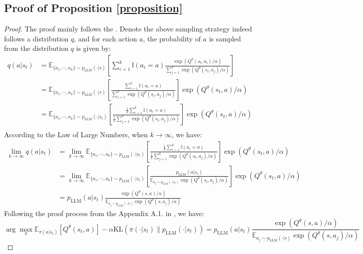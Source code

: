


\subsection{Proof of Proposition \ref{proposition}}
\propsa*
\begin{proof}
The proof mainly follows the \citep{li2024q}. Denote the above sampling strategy indeed follows a distribution $q$, and for each action $a$, the probability of $a$ is sampled from the distribution $q$ is given by:
\begin{equation}
    \begin{aligned}
            q(a|s_t)&=\mathbb{E}_{\{a_1,\cdots,a_k\}\sim p_\text{LLM}(\cdot|s)}\left[\sum_{i=1}^k \mathbb{I}(a_i=a) \frac{\exp( Q^\theta(s_t,a_i)/\alpha)}{\sum_{j=1}^k \exp( Q^\theta(s_t,a_j)/\alpha)}\right]\\
            &=\mathbb{E}_{\{a_1,\cdots,a_k\}\sim p_\text{LLM}(\cdot|s)}\left[ \frac{\sum_{i=1}^k \mathbb{I}(a_i=a)}{\sum_{j=1}^k \exp( Q^\theta(s_t,a_j)/\alpha)}\right]\exp( Q^\theta(s_t,a)/\alpha)\\
            &=\mathbb{E}_{\{a_1,\cdots,a_k\}\sim p_\text{LLM}(\cdot|s_t)}\left[ \frac{\frac{1}{k}\sum_{i=1}^k \mathbb{I}(a_i=a)}{\frac{1}{k}\sum_{j=1}^k \exp( Q^\theta(s_t,a_j)/\alpha)}\right]\exp( Q^\theta(s_t,a)/\alpha)\\
    \end{aligned}
\end{equation}
According to the Law of Large Numbers, when $k\rightarrow \infty$, we have:
\begin{equation}
\begin{aligned}
        \lim_{k\rightarrow\infty} q(a|s_t)&= \lim_{k\rightarrow\infty} \mathbb{E}_{\{a_1,\cdots,a_k\}\sim p_\text{LLM}(\cdot|s_t)}\left[ \frac{\frac{1}{k}\sum_{i=1}^k \mathbb{I}(a_i=a)}{\frac{1}{k}\sum_{j=1}^k \exp( Q^\theta(s_t,a_j)/\alpha)}\right]\exp( Q^\theta(s_t,a)/\alpha)\\
        &= \lim_{k\rightarrow\infty} \mathbb{E}_{\{a_1,\cdots,a_k\}\sim p_\text{LLM}(\cdot|s_t)}\left[ \frac{p_\text{LLM}(a|s_t)}{\mathbb{E}_{a_j \sim p_\text{LLM}(\cdot|s_t)} \exp( Q^\theta(s_t,a_j)/\alpha)}\right]\exp( Q^\theta(s_t,a)/\alpha)\\
        &= p_\text{LLM}(a|s_t)\frac{\exp( Q^\theta(s,a)/\alpha)}{\mathbb{E}_{a_j \sim p_\text{LLM}(\cdot|s)} \exp( Q^\theta(s,a_j)/\alpha)}
\end{aligned}
\end{equation}
Following the proof process from the Appendix A.1. in \cite{rafailov2023direct}, we have:
\begin{equation}
\label{dpo}
    \arg\max _\pi \mathbb{E}_{\pi(a|s_t)} [Q^\theta(s_t,a)]-\alpha \text{KL}\left(\pi(\cdot|s_t)\|p_\text{LLM}(\cdot|s_t)\right)=p_\text{LLM}(a|s_t)\frac{\exp( Q^\theta(s,a)/\alpha)}{\mathbb{E}_{a_j \sim p_\text{LLM}(\cdot|s)} \exp( Q^\theta(s,a_j)/\alpha)}
\end{equation}
\end{proof}

